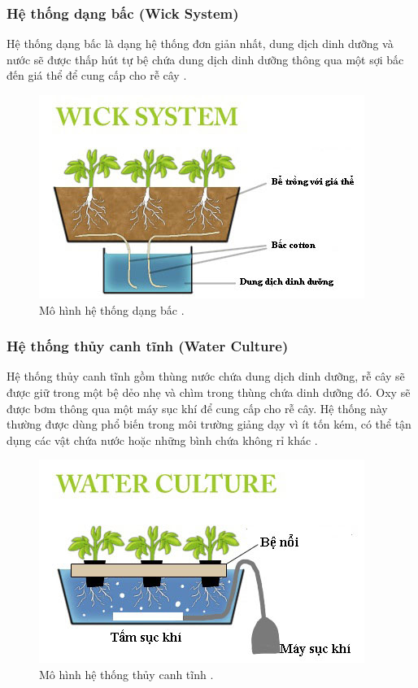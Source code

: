 \documentclass[a4paper,12pt,oneside]{article}
\begin{document}
\subsubsection{Hệ thống dạng bấc (Wick System)}
\noindent Hệ thống dạng bấc là dạng hệ thống đơn giản nhất, dung dịch dinh dưỡng và nước sẽ được thấp hút tự bệ chứa dung dịch dinh dưỡng thông qua một sợi bấc đến giá thể để cung cấp cho rễ cây \cite{thuycanh}.

\begin{figure}[H]
	\centering
	\includegraphics[scale=.8]{hinh/Wick_system.jpg}
	\caption{Mô hình hệ thống dạng bấc \cite{thuycanh}.}
	\label{fig:Wick_system}
\end{figure}

\subsubsection{Hệ thống thủy canh tĩnh (Water Culture)}
\noindent Hệ thống thủy canh tĩnh gồm thùng nước chứa dung dịch dinh dưỡng, rễ cây sẽ được giữ trong một bệ dẻo nhẹ và chìm trong thùng chứa dinh dưỡng đó. Oxy sẽ được bơm thông qua một máy sục khí để cung cấp cho rễ cây. Hệ thống này thường được dùng phổ biến trong môi trường giảng dạy vì ít tốn kém, có thể tận dụng các vật chứa nước hoặc những bình chứa không rỉ khác \cite{thuycanh}.

\begin{figure}[H]
	\centering
	\includegraphics[scale=.8]{hinh/Water_culture.jpg}
	\caption{Mô hình hệ thống thủy canh tĩnh \cite{thuycanh}.}
	\label{fig:Water_culture}
\end{figure}
\end{document}
